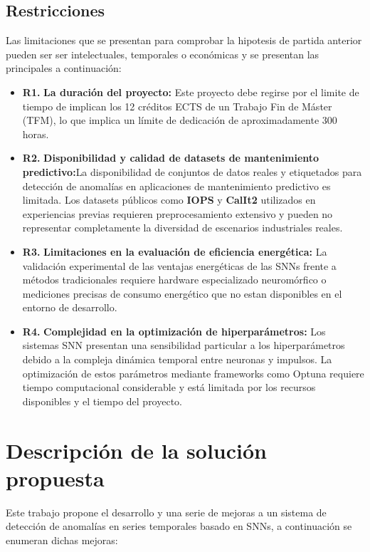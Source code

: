 \subsection{Restricciones}
Las limitaciones que se presentan para comprobar la hipotesis de partida anterior pueden ser ser intelectuales, temporales o económicas y se presentan las principales a continuación:
\begin{itemize}
    \item \textbf{R1.} \textbf{La duración del proyecto:} Este proyecto debe regirse por el limite de tiempo de implican los 12 créditos ECTS de un Trabajo Fin de Máster (TFM), lo que implica un límite de dedicación de aproximadamente 300 horas.
    \item \textbf{R2.} \textbf{Disponibilidad y calidad de datasets de mantenimiento predictivo:}La disponibilidad de conjuntos de datos reales y etiquetados para detección de anomalías en aplicaciones de mantenimiento predictivo es limitada. Los datasets públicos como \textbf{IOPS} y \textbf{CalIt2} utilizados en experiencias previas requieren preprocesamiento extensivo y pueden no representar completamente la diversidad de escenarios industriales reales.
    \item \textbf{R3.} \textbf{Limitaciones en la evaluación de eficiencia energética:} La validación experimental de las ventajas energéticas de las SNNs frente a métodos tradicionales requiere hardware especializado neuromórfico o mediciones precisas de consumo energético que no estan disponibles en el entorno de desarrollo.
    \item \textbf{R4.} \textbf{Complejidad en la optimización de hiperparámetros:} Los sistemas SNN presentan una sensibilidad particular a los hiperparámetros debido a la compleja dinámica temporal entre neuronas y impulsos. La optimización de estos parámetros mediante frameworks como Optuna requiere tiempo computacional considerable y está limitada por los recursos disponibles y el tiempo del proyecto.
\end{itemize}

\section{Descripción de la solución propuesta}

Este trabajo propone el desarrollo y una serie de mejoras a un sistema de detección de anomalías en series temporales basado en SNNs, a continuación se enumeran dichas mejoras:


